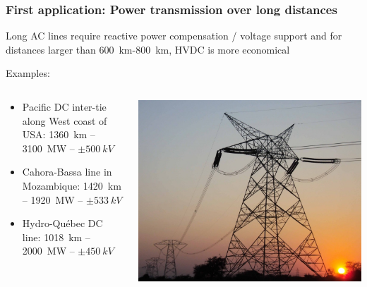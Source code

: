 \begin{frame}
\frametitle{First application: Power transmission over long distances}
Long AC lines require reactive power compensation / voltage support and for distances larger than \SI{600}{km}-\SI{800}{km}, HVDC is more economical

Examples:
\begin{columns}
\begin{column}{0.5\linewidth}
\begin{itemize}
    \item Pacific DC inter-tie along West coast of USA: \SI{1360}{km} -- \SI{3100}{MW} -- $\pm \SI{500}{kV}$
    \item Cahora-Bassa line in Mozambique: \SI{1420}{km} -- \SI{1920}{MW} -- $\pm \SI{533}{kV}$
    \item Hydro-Québec DC line: \SI{1018}{km} -- \SI{2000}{MW} -- $\pm \SI{450}{kV}$
\end{itemize}
\end{column}
\begin{column}{0.5\linewidth}
\begin{center}
    \includegraphics[width=0.7\linewidth]{images/overhead_line.jpg}
\end{center}
\end{column}
\end{columns}
\end{frame}

